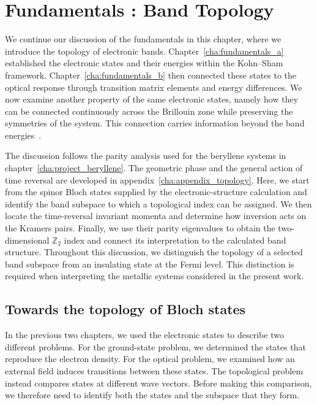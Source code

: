 \chapter{Fundamentals : Band Topology}
\label{cha:fundamentals_c}

We continue our discussion of the fundamentals in this chapter, where we introduce the topology of electronic bands.
Chapter~\ref{cha:fundamentals_a} established the electronic states and their energies within the Kohn--Sham framework.
Chapter~\ref{cha:fundamentals_b} then connected these states to the optical response through transition matrix elements and energy differences.
We now examine another property of the same electronic states, namely how they can be connected continuously across the Brillouin zone while preserving the symmetries of the system.
This connection carries information beyond the band energies~\cite{bansil2016colloquium}.

The discussion follows the parity analysis used for the beryllene systems in chapter~\ref{cha:project_beryllene}.
The geometric phase and the general action of time reversal are developed in appendix~\ref{cha:appendix_topology}.
Here, we start from the spinor Bloch states supplied by the electronic-structure calculation
and identify the band subspace to which a topological index can be assigned.
We then locate the time-reversal invariant momenta and determine how inversion acts on the Kramers pairs.
Finally, we use their parity eigenvalues to obtain the two-dimensional $\mathbb{Z}_2$ index and connect its interpretation to the calculated band structure.
Throughout this discussion, we distinguish the topology of a selected band subspace from an insulating state at the Fermi level.
This distinction is required when interpreting the metallic systems considered in the present work.

\newpage
\FloatBarrier
\section{Towards the topology of Bloch states}
\label{sec:toward_band_topology}

In the previous two chapters, we used the electronic states to describe two different problems.
For the ground-state problem, we determined the states that reproduce the electron density.
For the optical problem, we examined how an external field induces transitions between these states.
The topological problem instead compares states at different wave vectors.
Before making this comparison, we therefore need to identify both the states and the subspace that they form.

